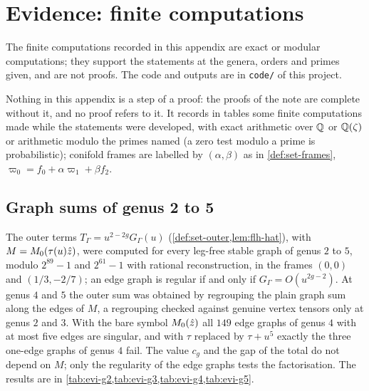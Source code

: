 \section{Evidence: finite computations}
\label{sec:evi}
\noindent{} The finite computations recorded in this appendix are exact or modular computations; they support the statements at the genera, orders and primes given, and are not proofs. The code and outputs are in \texttt{code/} of this project.


Nothing in this appendix is a step of a proof: the proofs of the note are complete without it, and no proof refers to it. It records in tables some finite computations made while the statements were developed, with exact arithmetic over $\mathbb{Q}$ or $\mathbb{Q}(\zeta)$ or arithmetic modulo the primes named (a zero test modulo a prime is probabilistic); conifold frames are labelled by $(\alpha,\beta)$ as in \cref{def:set-frames}, $\varpi_0=f_0+\alpha\varpi_1+\beta f_2$.

\subsection{Graph sums of genus 2 to 5}
\label{sec:evi-graphs}

The outer terms $T_\Gamma=u^{2-2g}G_\Gamma(u)$ (\cref{def:set-outer,lem:flh-hat}), with $M=M_{0}(\tau(u)\hat{z})$, were computed for every leg-free stable graph of genus $2$ to $5$, modulo $2^{89}-1$ and $2^{61}-1$ with rational reconstruction, in the frames $(0,0)$ and $(1/3,-2/7)$; an edge graph is regular if and only if $G_\Gamma=O(u^{2g-2})$. At genus $4$ and $5$ the outer sum was obtained by regrouping the plain graph sum along the edges of $M$, a regrouping checked against genuine vertex tensors only at genus $2$ and $3$. With the bare symbol $M_{0}(\hat{z})$ all $149$ edge graphs of genus $4$ with at most five edges are singular, and with $\tau$ replaced by $\tau+u^5$ exactly the three one-edge graphs of genus $4$ fail. The value $c_g$ and the gap of the total do not depend on $M$; only the regularity of the edge graphs tests the factorisation. The results are in \cref{tab:evi-g2,tab:evi-g3,tab:evi-g4,tab:evi-g5}.

